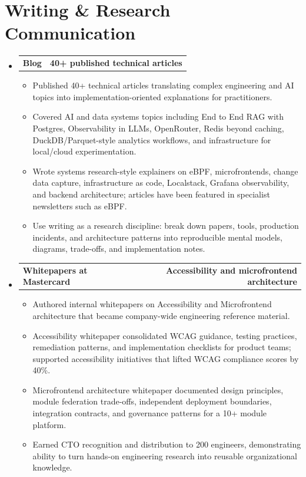 \documentclass[a4paper,11pt]{article}
\makeatletter
\newcommand{\resumeItem}[1]{
  \item\small{{#1 \vspace{-3pt}}}
}
\newcommand{\resumeProjectHeading}[2]{
  \vspace{-3pt}\item
    \begin{tabular*}{1.0\textwidth}[t]{l@{\extracolsep{\fill}}r}
      \textbf{#1} & \textbf{\small #2} \\
    \end{tabular*}\vspace{-7pt}
}
\newcommand{\resumeSubHeadingListStart}{\begin{itemize}[leftmargin=0.0in, label={}]}
\newcommand{\resumeSubHeadingListEnd}{\end{itemize}}
\newcommand{\resumeItemListStart}{\begin{itemize}}
\newcommand{\resumeItemListEnd}{\end{itemize}\vspace{0pt}}
\makeatother
\begin{document}
\section{Writing \& Research Communication}
\resumeSubHeadingListStart
  \resumeProjectHeading{Blog}{40+ published technical articles}
    \resumeItemListStart
      \resumeItem{Published 40+ technical articles translating complex engineering and AI topics into implementation-oriented explanations for practitioners.}
      \resumeItem{Covered AI and data systems topics including End to End RAG with Postgres, Observability in LLMs, OpenRouter, Redis beyond caching, DuckDB/Parquet-style analytics workflows, and infrastructure for local/cloud experimentation.}
      \resumeItem{Wrote systems research-style explainers on eBPF, microfrontends, change data capture, infrastructure as code, Localstack, Grafana observability, and backend architecture; articles have been featured in specialist newsletters such as eBPF.}
      \resumeItem{Use writing as a research discipline: break down papers, tools, production incidents, and architecture patterns into reproducible mental models, diagrams, trade-offs, and implementation notes.}
    \resumeItemListEnd
  \resumeProjectHeading{Whitepapers at Mastercard}{Accessibility and microfrontend architecture}
    \resumeItemListStart
      \resumeItem{Authored internal whitepapers on Accessibility and Microfrontend architecture that became company-wide engineering reference material.}
      \resumeItem{Accessibility whitepaper consolidated WCAG guidance, testing practices, remediation patterns, and implementation checklists for product teams; supported accessibility initiatives that lifted WCAG compliance scores by 40\%.}
      \resumeItem{Microfrontend architecture whitepaper documented design principles, module federation trade-offs, independent deployment boundaries, integration contracts, and governance patterns for a 10+ module platform.}
      \resumeItem{Earned CTO recognition and distribution to 200 engineers, demonstrating ability to turn hands-on engineering research into reusable organizational knowledge.}
    \resumeItemListEnd
\resumeSubHeadingListEnd
\end{document}
